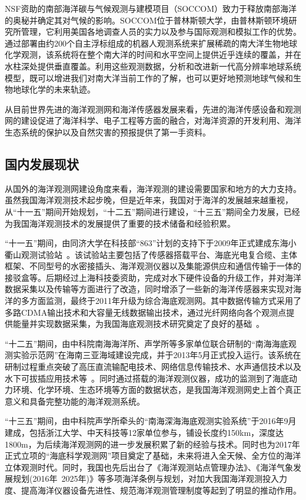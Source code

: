 NSF资助的南部海洋碳与气候观测与建模项目（SOCCOM）致力于释放南部海洋的奥秘并确定其对气候的影响。SOCCOM位于普林斯顿大学，由普林斯顿环境研究所管理，它利用美国各地调查人员的实力以及参与国际观测和模拟工作的优势。通过部署由约200个自主浮标组成的机器人观测系统来扩展稀疏的南大洋生物地球化学观测，该系统将在整个南大洋的时间和水平空间上提供近乎连续的覆盖，并在水柱深处提供垂直覆盖。利用这些观测数据，分析和改进新一代高分辨率地球系统模型，既可以增进我们对南大洋当前工作的了解，也可以更好地预测地球气候和生物地球化学的未来轨迹。

从目前世界先进的海洋观测网和海洋传感器发展来看，先进的海洋传感设备和观测网的建设促进了海洋科学、电子工程等方面的融合，对海洋资源的开发利用、海洋生态系统的保护以及自然灾害的预报提供了第一手资料。

\subsection{国内发展现状}

从国外的海洋观测网建设角度来看，海洋观测的建设需要国家和地方的大力支持。虽然我国海洋观测技术起步晚，但是近年来，我国对于海洋的发展越来越重视，从“十一五”期间开始规划，“十二五”期间进行建设，“十三五”期间全力发展，已经为我国海洋观测技术的发展提供了重要的技术储备和经验积累。

“十一五”期间，由同济大学在科技部“863”计划的支持下于2009年正式建成东海小衢山观测试验站~\cite{2011xhp}。该试验站主要包括了传感器搭载平台、海底光电复合缆、主体框架、不同型号的水密接插头、海洋观测仪器以及集能源供应和通信传输于一体的接驳盒等。后期经过上海科技委资助，完成对水下硬件设备的升级工作，并对海洋数据采集以及传输等方面进行了改造，同时增添了一些新的海洋传感器来实现对海洋的多方面监测，最终于2011年升级为综合海底观测网。其中数据传输方式采用了多路CDMA输出技术和大容量无线数据输出技术，通过光纤网络向各个观测点提供能量并实现数据采集，为我国海底观测技术研究奠定了良好的基础~\cite{2020cjd}。

“十二五”期间，由中科院南海海洋所、声学所等多家单位联合研制的“南海海底观测实验示范网”在海南三亚海域建设完成，并于2013年5月正式投入运行。该系统在研制过程重点突破了高压直流输配电技术、网络信息传输技术、水声通信技术以及水下可拔插应用技术等~\cite{2019lfh}。同时通过搭载的海洋观测仪器，成功的监测到了海底动力环境、化学环境、生态环境等方面的数据状态，是我国海洋观测网史上首个真正意义和具备完整功能的海洋观测系统。

“十三五”期间，由中科院声学所牵头的“南海深海海底观测实验系统”于2016年9月建成，包括浙江大学、中天科技等12家单位参与，铺设长度约150km，深度达1800m，为后续海洋观测网的进一步发展积累了新的经验与技术。同时也为2017年正式立项的“海底科学观测网”项目奠定了基础，未来将进入全天候、全方位的海洋立体观测时代。同时，我国也先后出台了《海洋观测站点管理办法》、《海洋气象发展规划(2016年~2025年)》等多项海洋条例与规划，对加大我国海洋观测投入力度、提高海洋仪器设备先进性、规范海洋观测管理制度等起到了明显的推动作用。


